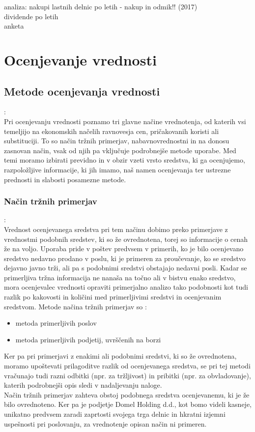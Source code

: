 \documentclass[12pt,a4paper]{amsart}
\theoremstyle{definition} %
\theoremstyle{plain} %
\begin{document}
analiza: nakupi lastnih delnic po letih - nakup in odmik!! (2017)\\
dividende po letih\\
anketa\\




\section{Ocenjevanje vrednosti}
\subsection{Metode ocenjevanja vrednosti}:\\
Pri ocenjevanju vrednosti poznamo tri glavne načine vrednotenja, od katerih vsi temeljijo na ekonomskih načelih ravnovesja cen, pričakovanih koristi ali substituciji. To so način tržnih primerjav, nabavnovrednostni in na donosu zasnovan način, vsak od njih pa vključuje podrobnejše metode uporabe. Med temi moramo izbirati previdno in v obzir vzeti vrsto sredstva, ki ga ocenjujemo, razpoložljive informacije, ki jih imamo, naš namen ocenjevanja ter ustrezne prednosti in slabosti posamezne metode. 

\subsubsection{Način tržnih primerjav}:\\
Vrednost ocenjevanega sredstva pri tem načinu dobimo preko primerjave z vrednostmi podobnih sredstev, ki so že ovrednotena, torej so informacije o cenah že na voljo. Uporaba pride v poštev predvsem v primerih, ko je bilo ocenjevano sredstvo nedavno prodano v poslu, ki je primeren za proučevanje, ko se sredstvo dejavno javno trži, ali pa s podobnimi sredstvi obstajajo nedavni posli. Kadar se primerljiva tržna informacija ne nanaša na točno ali v bistvu enako sredstvo, mora ocenjevalec vrednosti opraviti primerjalno analizo tako podobnosti kot tudi razlik po kakovosti in količini med primerljivimi sredstvi in ocenjevanim sredstvom. 
Metode načina tržnih primerjav so :
\begin{itemize}
\item metoda primerljivih poslov
\item metoda primerljivih podjetij, uvrščenih na borzi
\end{itemize}
Ker pa pri primerjavi z enakimi ali podobnimi sredstvi, ki so že ovrednotena, moramo upoštevati prilagoditve razlik od ocenjevanega sredstva, se pri tej metodi vračunajo tudi razni odbitki (npr. za tržljivost) in pribitki (npr. za obvladovanje), katerih podrobnejši opis sledi v nadaljevanju naloge.\\
Način tržnih primerjav zahteva obstoj podobnega sredstva ocenjevanemu, ki je že bilo ovrednoteno. Ker pa je podjetje Domel Holding d.d., kot bomo videli kasneje, unikatno predvsem zaradi zaprtosti svojega trga delnic in hkratni izjemni uspešnosti pri poslovanju, za vrednotenje opisan način ni primeren. 
\end{document}

